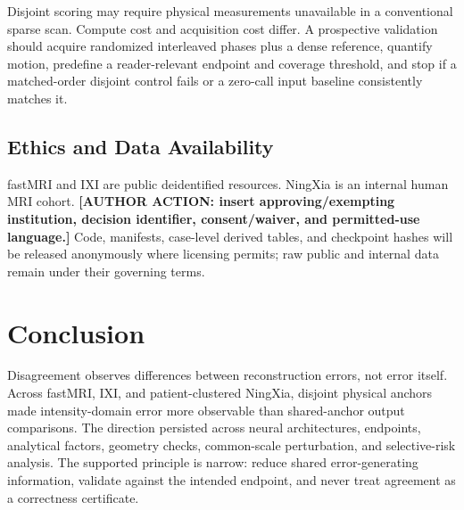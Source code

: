 \documentclass[journal,10pt]{IEEEtran}
\begin{document}
Disjoint scoring may require physical measurements unavailable in a conventional sparse scan. Compute cost and acquisition cost differ. A prospective validation should acquire randomized interleaved phases plus a dense reference, quantify motion, predefine a reader-relevant endpoint and coverage threshold, and stop if a matched-order disjoint control fails or a zero-call input baseline consistently matches it.

\subsection{Ethics and Data Availability}
fastMRI and IXI are public deidentified resources. NingXia is an internal human MRI cohort. \textbf{[AUTHOR ACTION: insert approving/exempting institution, decision identifier, consent/waiver, and permitted-use language.] } Code, manifests, case-level derived tables, and checkpoint hashes will be released anonymously where licensing permits; raw public and internal data remain under their governing terms.

\section{Conclusion}
Disagreement observes differences between reconstruction errors, not error itself. Across fastMRI, IXI, and patient-clustered NingXia, disjoint physical anchors made intensity-domain error more observable than shared-anchor output comparisons. The direction persisted across neural architectures, endpoints, analytical factors, geometry checks, common-scale perturbation, and selective-risk analysis. The supported principle is narrow: reduce shared error-generating information, validate against the intended endpoint, and never treat agreement as a correctness certificate.



\end{document}
